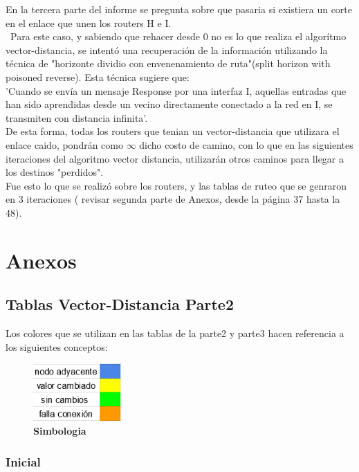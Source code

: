 \documentclass[12pt]{article}
\begin{document}
	En la tercera parte del informe se pregunta sobre que pasaria si existiera 
un corte en el enlace que unen los routers H e I.\\\
	Para este caso, y sabiendo que rehacer desde 0 no es lo que realiza el algorítmo vector-distancia, se intentó una recuperación de la información utilizando la técnica de "horizonte dividio con envenenamiento de ruta"(split horizon with poisoned reverse). Esta técnica sugiere que:\\
	'Cuando se envía un mensaje Response por una interfaz I, aquellas entradas que han sido aprendidas desde un vecino directamente conectado a la red en I, se transmiten con distancia infinita'.\\
	De esta forma, todas los routers que tenian un vector-distancia que utilizara el enlace caido, pondrán como  $\infty$ dicho costo de camino, con lo que en las siguientes iteraciones del algoritmo vector distancia, utilizarán otros caminos para llegar a los destinos "perdidos".\\
	
	Fue esto lo que se realizó sobre los routers, y las tablas de ruteo que se genraron en 3 iteraciones ( revisar segunda parte de Anexos, desde la página 37 hasta la 48).

\section{Anexos}
 
\subsection{Tablas Vector-Distancia Parte2}
Los colores que se utilizan en las tablas de la parte2 y parte3 hacen referencia a los siguientes conceptos:

\begin{figure}[H] 
\centering 
\includegraphics[width=0.3\textwidth]{imagenes/simbologia.png} \caption{\small \textbf{Simbologia}}
\label{fig:diagrama_6} 
\end{figure}

\subsubsection{Inicial}
\end{document}
